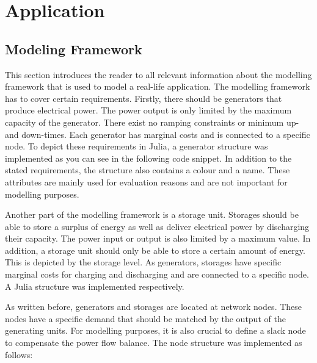 \section{Application}


\subsection{Modeling Framework}

This section introduces the reader to all relevant information about the modelling framework that is used to model a real-life application. The modelling framework has to cover certain requirements. Firstly, there should be generators that produce electrical power. The power output is only limited by the maximum capacity of the generator. There exist no ramping constraints or minimum up- and down-times. Each generator has marginal costs and is connected to a specific node. To depict these requirements in Julia, a generator structure was implemented as you can see in the following code snippet. In addition to the stated requirements, the structure also contains a colour and a name. These attributes are mainly used for evaluation reasons and are not important for modelling purposes. 



Another part of the modelling framework is a storage unit. Storages should be able to store a surplus of energy as well as deliver electrical power by discharging their capacity. The power input or output is also limited by a maximum value. In addition, a storage unit should only be able to store a certain amount of energy. This is depicted by the storage level. As generators, storages have specific marginal costs for charging and discharging and are connected to a specific node. A Julia structure was implemented respectively.  

As written before, generators and storages are located at network nodes. These nodes have a specific demand that should be matched by the output of the generating units. For modelling purposes, it is also crucial to define a slack node to compensate the power flow balance. The node structure was implemented as follows:



